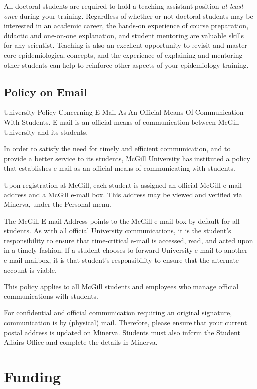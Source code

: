 \documentclass[
  letterpaper,
  DIV=11,
  numbers=noendperiod]{scrreprt}
\begin{document}
All doctoral students are required to hold a teaching assistant position
\emph{at least once} during your training. Regardless of whether or not
doctoral students may be interested in an academic career, the hands-on
experience of course preparation, didactic and one-on-one explanation,
and student mentoring are valuable skills for any scientist. Teaching is
also an excellent opportunity to revisit and master core epidemiological
concepts, and the experience of explaining and mentoring other students
can help to reinforce other aspects of your epidemiology training.

\section{Policy on Email}\label{policy-on-email}

University Policy Concerning E-Mail As An Official Means Of
Communication With Students. E-mail is an official means of
communication between McGill University and its students.

In order to satisfy the need for timely and efficient communication, and
to provide a better service to its students, McGill University has
instituted a policy that establishes e-mail as an official means of
communicating with students.

Upon registration at McGill, each student is assigned an official McGill
e-mail address and a McGill e-mail box. This address may be viewed and
verified via Minerva, under the Personal menu.

The McGill E-mail Address points to the McGill e-mail box by default for
all students. As with all official University communications, it is the
student's responsibility to ensure that time-critical e-mail is
accessed, read, and acted upon in a timely fashion. If a student chooses
to forward University e-mail to another e-mail mailbox, it is that
student's responsibility to ensure that the alternate account is viable.

This policy applies to all McGill students and employees who manage
official communications with students.

For confidential and official communication requiring an original
signature, communication is by (physical) mail. Therefore, please ensure
that your current postal address is updated on Minerva. Students must
also inform the Student Affairs Office and complete the details in
Minerva.


\chapter{Funding}\label{funding}
\end{document}
